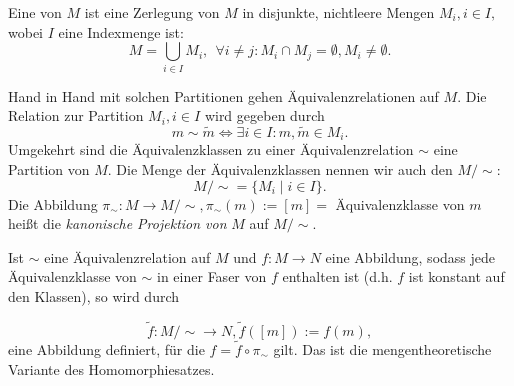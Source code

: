 \documentclass[12pt]{book}   %
\begin{document}
Eine  von $M$ ist eine Zerlegung von $M$ in 
disjunkte, nichtleere Mengen $M_i,i\in I,$ wobei $I$ eine Indexmenge ist:
$$M=\bigcup_{i\in I} M_i,\ \ \forall i\neq j: M_i\cap M_j = \emptyset, 
M_i\neq\emptyset.$$

Hand in Hand mit solchen Partitionen gehen \"Aquivalenzrelationen auf $M.$
Die Relation zur Partition $M_i,i\in I$ wird gegeben durch
$$m\sim \tilde m \iff \exists i\in I: m,\tilde m\in M_i.$$
Umgekehrt sind die \"Aquivalenzklassen zu einer \"Aquivalenzrelation $\sim $ 
eine Partition von $M.$ Die Menge der \"Aquivalenzklassen nennen wir auch den
 $M/\sim$:
$$M/\sim = \{M_i\mid i\in I\}.$$
Die Abbildung $\pi_\sim: M\longrightarrow M/\sim, \pi_\sim(m):= [m] = $ 
\"Aquivalenzklasse von $m$ hei\ss t die {\it kanonische Projektion von } $M$ 
auf $M/\sim$.

Ist $\sim$ eine \"Aquivalenzrelation auf $M$ und $f:M\longrightarrow N$ eine
Abbildung, sodass
jede \"Aquivalenzklasse von $\sim$ in einer Faser von $f$ enthalten ist (d.h.
$f$ ist konstant auf den Klassen), so wird durch 

$$\tilde f:M/\sim \longrightarrow N, \tilde f([m]) := f(m),$$
eine Abbildung definiert, f\"ur die $f=\tilde f \circ \pi_\sim$ gilt. Das ist
die mengentheoretische Variante des Homomorphiesatzes.
\end{document}
